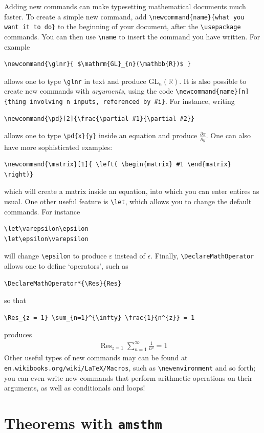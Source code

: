 \documentclass[11pt]{article}
\newcommand{\pd}[2]{\frac{\partial #1}{\partial #2}}
\DeclareMathOperator*{\Res}{Res}
\newcommand{\eqn}[1]{\begin{align*} #1 \end{align*}}
\begin{document}
Adding new commands can make typesetting mathematical documents much faster. To create a simple new command, add \verb$\newcommand{name}{what you want it to do}$ to the beginning of your document, after the \verb$\usepackage$ commands. You can then use \verb$\name$ to insert the command you have written. For example
\begin{verbatim}
\newcommand{\glnr}{ $\mathrm{GL}_{n}(\mathbb{R})$ }
\end{verbatim}
allows one to type \verb$\glnr$ in text and produce $\mathrm{GL}_{n}( \mathbb{R})$. It is also possible to create new commands with \textit{arguments}, using the code \verb$\newcommand{name}[n]{thing involving n inputs, referenced by #i}$. For instance, writing
\begin{verbatim}
\newcommand{\pd}[2]{\frac{\partial #1}{\partial #2}}
\end{verbatim}
allows one to type \verb$\pd{x}{y}$ inside an equation and produce $\pd{x}{y}$. One can also have more sophisticated examples:
\begin{verbatim}
\newcommand{\matrix}[1]{ \left( \begin{matrix} #1 \end{matrix} \right)}
\end{verbatim}
which will create a matrix inside an equation, into which you can enter entires as usual. One other useful feature is \verb$\let$, which allows you to change the default commands. For instance
\begin{verbatim}
\let\varepsilon\epsilon
\let\epsilon\varepsilon
\end{verbatim}
will change \verb$\epsilon$ to produce $\varepsilon$ instead of $\epsilon$. Finally, \verb$\DeclareMathOperator$ allows one to define `operators', such as
\begin{verbatim}
\DeclareMathOperator*{\Res}{Res}
\end{verbatim}
so that
\begin{verbatim}
\Res_{z = 1} \sum_{n=1}^{\infty} \frac{1}{n^{z}} = 1
\end{verbatim}
produces
\eqn{
\Res_{z = 1} \sum_{n=1}^{\infty} \frac{1}{n^{z}} = 1
}
Other useful types of new commands may can be found at \texttt{en.wikibooks.org/wiki/LaTeX/Macros}, such as \verb$\newenvironment$ and so forth; you can even write new commands that perform arithmetic operations on their arguments, as well as conditionals and loops!

\section{Theorems with \texttt{amsthm}}
\end{document}
